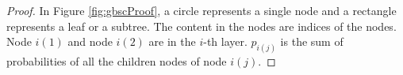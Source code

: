 \begin{proof}





In Figure \ref{fig:gbscProof}, a circle represents a single node and a rectangle  represents a leaf or a subtree. The content in the nodes are indices of the nodes. Node $i(1)$ and node $i(2)$ are in the $i$-th layer. $p_{i(j)}$ is the sum of probabilities of all the children nodes of node $i(j)$. 



\end{proof}
